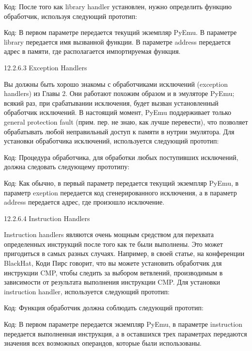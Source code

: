 \documentclass[12pt]{book}
\begin{document}
Код:
После того как library handler установлен, нужно определить функцию обработчик, используя следующий прототип:

Код:
В первом параметре передается текущий экземпляр PyEmu. В параметре library передается имя вызванной функции. В параметре address передается адрес в памяти, где располагается импортируемая функция. 

12.2.6.3 Exception Handlers

Вы должны быть хорошо знакомы с обработчиками исключений (exception handlers) из Главы 2. Они работают похожим образом и в эмуляторе PyEmu; всякий раз, при срабатывании исключения, будет вызван установленный обработчик исключений. В настоящий момент, PyEmu поддерживает только general protection fault (прим. пер. не знаю, как лучше перевести), что позволяет обрабатывать любой неправильный доступ к памяти в нутрии эмулятора. Для установки обработчика исключений, используется следующий прототип: 

Код:
Процедура обработчика, для обработки любых поступивших исключений, должна следовать следующему прототипу:

Код:
Как обычно, в первый параметр передается текущий экземпляр PyEmu, в параметр exeption передается код сгенерированного исключения, а в параметр address передается адрес, где произошло исключение.

12.2.6.4 Instruction Handlers

Instruction handlers являются очень мощным средством для перехвата определенных инструкций после того как те были выполнены. Это может пригодиться в самых разных случаях. Например, в своей статье, на конференции BlackHat, Коди Пирс говорит, что вы можете установить обработчик для инструкции CMP, чтобы следить за выбором ветвлений, производимым в зависимости от результата выполнения инструкции CMP. Для установки instruction handler, используется следующий прототип:

Код:
Функция обработчик должна соблюдать следующий прототип:

Код:
В первом параметре передается экземпляр PyEmu, в параметре instruction передается выполненная инструкция, а в оставшихся трех параметрах передаются значения всех возможных операндов, которые были использованы. 
\end{document}
